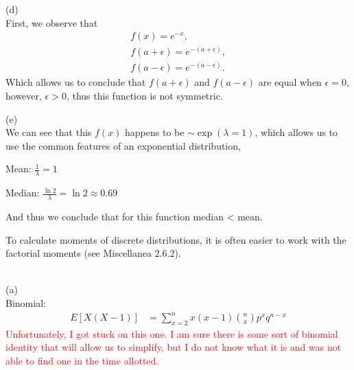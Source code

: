 \documentclass[12pt,letterpaper]{exam}
\begin{document}
\begin{questions}
\begin{solution}
		
		(d)\\
		First, we observe that
		\begin{align*}
			f(x) = e^{-x}, \\
			f(a+\epsilon) = e^{-(a+\epsilon)}, \\
			f(a-\epsilon) = e^{-(a-\epsilon)}.
		\end{align*}
		Which allows us to conclude that $f(a+\epsilon)$ and $f(a-\epsilon)$ are equal when $\epsilon=0$,
		however, $\epsilon>0$, thus this function is not symmetric.
		
		
		(e) \\
		We can see that this $f(x)$ happens to be $\sim\exp(\lambda=1)$, which allows us to use the common
		features of an exponential distribution,
		
		Mean: $\frac{1}{\lambda} = 1$
		
		Median: $\frac{\ln 2}{\lambda} = \ln 2 \approx 0.69$
		
		And thus we conclude that for this function median < mean.
		
		
	\end{solution}

	\setcounter{question}{28}
	\question To calculate moments of discrete distributions, it is often easier to work with the factorial moments (see Miscellanea 2.6.2). 
	
	\begin{solution} \\
		(a) \\
		Binomial:
		\begin{align*}
			E[X(X-1)] 
			&= \sum_{x=2}^{n} x(x-1) \binom{n}{x} p^{x}q^{n-x}
		\end{align*}
		\textcolor{red}{Unfortunately, I got stuck on this one. I am sure there is some sort of 
			binomial identity that will allow us to simplify, but I do not know what it is and 
			was not able to find one in the time allotted.}\\
			

\end{solution}
\end{questions}
\end{document}
